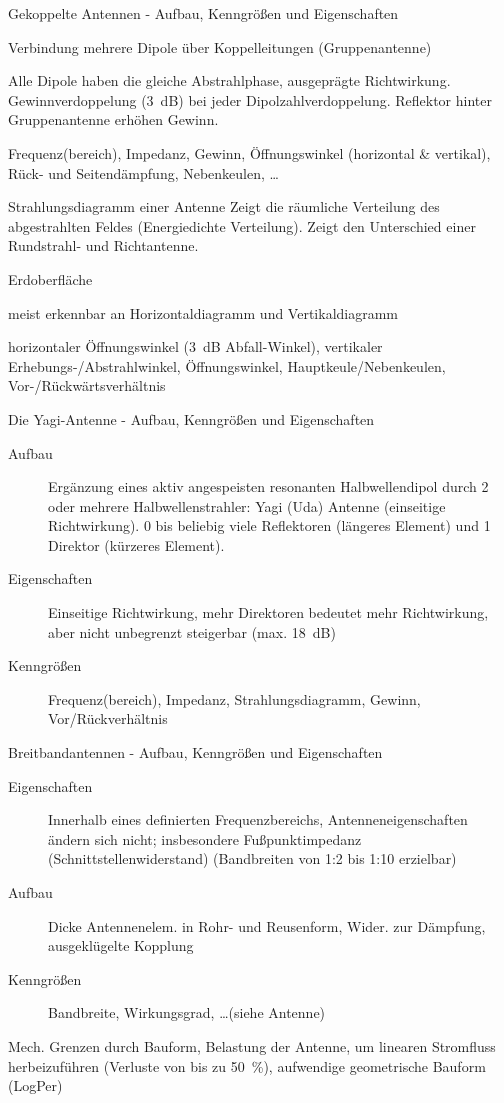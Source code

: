 \documentclass[avery5371,grid,frame,a4paper]{flashcards}
\newcommand{\card}[3]{
  \begin{flashcard}[{\chap} -- #1]{#2}#3\end{flashcard}
}
\begin{document}
\card{66}{Gekoppelte Antennen - Aufbau, Kenngrößen und Eigenschaften}{
  \begin{description}\itemsep0pt
    \item[Aufbau]
      Verbindung mehrere Dipole über Koppelleitungen (Gruppenantenne)
    \item[Eigenschaften]
      Alle Dipole haben die gleiche Abstrahlphase, ausgeprägte Richtwirkung.
      Gewinnverdoppelung (\SI{3}{\dB}) bei jeder Dipolzahlverdoppelung.
      Reflektor hinter Gruppenantenne erhöhen Gewinn.
    \item[Kenngrößen]
      Frequenz(bereich), Impedanz, Gewinn, Öffnungswinkel (horizontal \& vertikal), Rück- und Seitendämpfung, Nebenkeulen, \dots
  \end{description}
}
\card{67}{Strahlungsdiagramm einer Antenne}{
  \small
  Zeigt die räumliche Verteilung des abgestrahlten Feldes (Energiedichte Verteilung).
  Zeigt den Unterschied einer Rundstrahl- und Richtantenne.

  \begin{description}\itemsep0pt
    \item[Bezugsfläche] Erdoberfläche
    \item[Charaktisierung] meist erkennbar an Horizontaldiagramm und Vertikaldiagramm
    \item[Kenngrößen]
      horizontaler Öffnungswinkel (\SI{3}{\dB} Abfall-Winkel),
      vertikaler Erhebungs-/Abstrahlwinkel,
      Öffnungswinkel,
      Hauptkeule/Nebenkeulen,
      Vor-/Rückwärtsverhältnis
  \end{description}
}
\card{68}{Die Yagi-Antenne - Aufbau, Kenngrößen und Eigenschaften}{
  \small
  \begin{description}
    \item[Aufbau]
      Ergänzung eines aktiv angespeisten resonanten Halbwellendipol durch 2 oder mehrere Halbwellenstrahler: Yagi (Uda) Antenne (einseitige Richtwirkung). 0 bis beliebig viele Reflektoren (längeres Element) und 1 Direktor (kürzeres Element).
    \item[Eigenschaften]
      Einseitige Richtwirkung, mehr Direktoren bedeutet mehr Richtwirkung, aber nicht unbegrenzt steigerbar (max. \SI{18}{\dB})
  \item[Kenngrößen]
    Frequenz(bereich), Impedanz, Strahlungsdiagramm, Gewinn, Vor/Rückverhältnis
  \end{description}
}
\card{69}{Breitbandantennen - Aufbau, Kenngrößen und Eigenschaften}{
  \small
  \begin{description}
    \item[Eigenschaften]
      Innerhalb eines definierten Frequenzbereichs,
      Antenneneigenschaften ändern sich nicht;
      insbesondere Fußpunktimpedanz (Schnittstellenwiderstand)
      (Bandbreiten von 1:2 bis 1:10 erzielbar)
    \item[Aufbau]
      Dicke Antennenelem. in Rohr- und Reusenform, Wider. zur Dämpfung, ausgeklügelte Kopplung
    \item[Kenngrößen]
      Bandbreite, Wirkungsgrad, \dots {\tiny (siehe Antenne)}
  \end{description}
  Mech. Grenzen durch Bauform,
  Belastung der Antenne, um linearen Stromfluss herbeizuführen (Verluste von bis zu \SI{50}{\percent}),
  aufwendige geometrische Bauform (LogPer)
}
\end{document}
